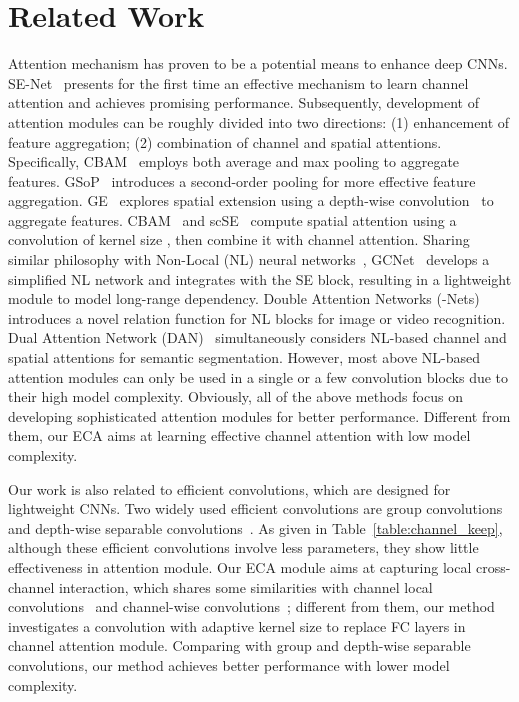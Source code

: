 \documentclass[10pt,twocolumn,letterpaper]{article}
\begin{document}
\section{Related Work}
Attention mechanism has proven to be a potential means to enhance deep CNNs. SE-Net~\cite{SENet18} presents for the first time an effective mechanism to learn channel attention and achieves promising performance. Subsequently, development of attention modules can be roughly divided into two directions: (1) enhancement of feature aggregation; (2) combination of channel and spatial attentions. Specifically, CBAM~\cite{Woo_2018_ECCV} employs both average and max pooling to aggregate features. GSoP~\cite{Gao_2019_CVPR} introduces a second-order pooling for more effective feature aggregation. GE~\cite{DBLP:conf/nips/HuSASV18} explores spatial extension using a depth-wise convolution~\cite{DBLP:conf/cvpr/Chollet17} to aggregate features.  CBAM~\cite{Woo_2018_ECCV} and scSE~\cite{DBLP:journals/tmi/RoyNW19} compute spatial attention using a  convolution of kernel size , then combine it with channel attention. Sharing similar philosophy with Non-Local (NL) neural networks~\cite{Wang_2018_CVPR},
GCNet~\cite{Cao_2019_ICCV_Workshops} develops a simplified NL network and integrates with the SE block, resulting in a lightweight module to model long-range dependency. Double Attention Networks (-Nets)~\cite{A2NIPS18} introduces a novel relation function for NL blocks for image or video recognition. Dual Attention Network (DAN)~\cite{Fu_2019_CVPR} simultaneously considers NL-based channel and spatial attentions for semantic segmentation. However, most above NL-based attention modules can only be used in a single or a few convolution blocks due to their high model complexity. Obviously, all of the above methods focus on developing sophisticated attention modules for better performance. Different from them, our ECA aims at learning effective channel attention with low model complexity.

Our work is also related to efficient convolutions, which are designed for lightweight CNNs. Two widely used efficient convolutions are group convolutions~\cite{Zhang_2017_ICCV,XieGDTH17,Ioannou_2017_CVPR} and depth-wise separable convolutions~\cite{DBLP:conf/cvpr/Chollet17,DBLP:conf/cvpr/SandlerHZZC18,DBLP:conf/cvpr/ZhangZLS18,DBLP:conf/eccv/MaZZS18}. As given in Table~\ref{table:channel_keep}, although these efficient convolutions involve less parameters, they show little effectiveness in attention module. Our ECA module aims at capturing local cross-channel interaction, which shares some similarities with channel local convolutions~\cite{DBLP:conf/cvpr/Zhang18} and channel-wise convolutions~\cite{DBLP:conf/nips/GaoWJ18}; different from them, our method investigates a  convolution with adaptive kernel size to replace FC layers in channel attention module. Comparing with group and depth-wise separable convolutions, our method achieves better performance with lower model complexity.
\end{document}
